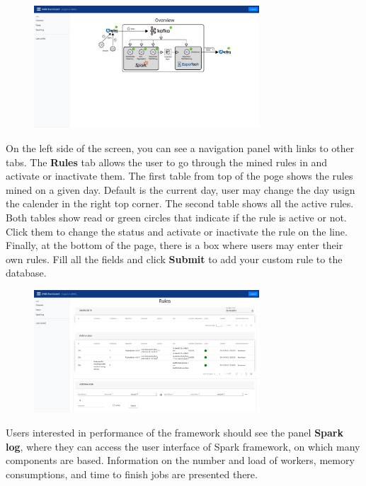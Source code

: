 \documentclass[a4paper]{article} %
\begin{document}
\begin{figure}[h]
  \centering
  \includegraphics[width=0.75\textwidth]{fig/dashboard_overview}
\end{figure}

On the left side of the screen, you can see a navigation panel with links to other tabs. The \textbf{Rules} tab allows the user to go through the mined rules in and activate or inactivate them. The first table from top of the poge shows the rules mined on a given day. Default is the current day, user may change the day usign the calender in the right top corner. The second table shows all the active rules. Both tables show read or green circles that indicate if the rule is active or not. Click them to change the status and activate or inactivate the rule on the line. Finally, at the bottom of the page, there is a box where users may enter their own rules. Fill all the fields and click \textbf{Submit} to add your custom rule to the database.

\begin{figure}[h]
  \centering
  \includegraphics[width=0.75\textwidth]{fig/dashboard_rules}
\end{figure}

Users interested in performance of the framework should see the panel \textbf{Spark log}, where they can access the user interface of Spark framework, on which many components are based. Information on the number and load of workers, memory consumptions, and time to finish jobs are presented there.
\end{document}
